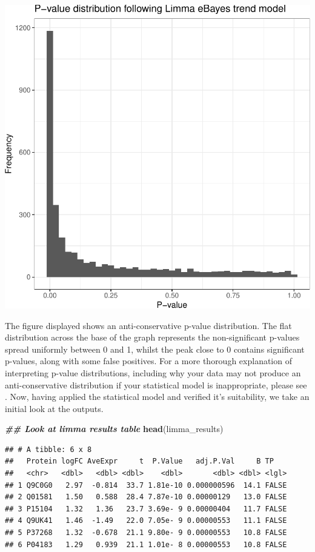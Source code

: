 \documentclass[9pt,a4paper,]{extarticle}
\newenvironment{Shaded}{\begin{snugshade}}{\end{snugshade}}
\newcommand{\DocumentationTok}[1]{\textcolor[rgb]{0.56,0.35,0.01}{\textbf{\textit{#1}}}}
\newcommand{\FunctionTok}[1]{\textcolor[rgb]{0.13,0.29,0.53}{\textbf{#1}}}
\newcommand{\NormalTok}[1]{#1}
\begin{document}
\begin{center}\includegraphics[height=0.3\textheight]{workflow_expressions_files/figure-latex/pvalue_histogram-1} \end{center}

The figure displayed shows an anti-conservative p-value distribution. The flat
distribution across the base of the graph represents the non-significant p-values
spread uniformly between 0 and 1, whilst the peak close to 0 contains significant
p-values, along with some false positives. For a more thorough explanation of
interpreting p-value distributions, including why your data may not produce an
anti-conservative distribution if your statistical model is inappropriate, please
see \citep{p_val}. Now, having applied the statistical model and verified it's
suitability, we take an initial look at the outputs.

\begin{Shaded}
\begin{Highlighting}[]
\DocumentationTok{\#\# Look at limma results table}
\FunctionTok{head}\NormalTok{(limma\_results)}
\end{Highlighting}
\end{Shaded}

\begin{verbatim}
## # A tibble: 6 x 8
##   Protein logFC AveExpr     t  P.Value   adj.P.Val     B TP   
##   <chr>   <dbl>   <dbl> <dbl>    <dbl>       <dbl> <dbl> <lgl>
## 1 Q9C0G0   2.97  -0.814  33.7 1.81e-10 0.000000596  14.1 FALSE
## 2 Q01581   1.50   0.588  28.4 7.87e-10 0.00000129   13.0 FALSE
## 3 P15104   1.32   1.36   23.7 3.69e- 9 0.00000404   11.7 FALSE
## 4 Q9UK41   1.46  -1.49   22.0 7.05e- 9 0.00000553   11.1 FALSE
## 5 P37268   1.32  -0.678  21.1 9.80e- 9 0.00000553   10.8 FALSE
## 6 P04183   1.29   0.939  21.1 1.01e- 8 0.00000553   10.8 FALSE
\end{verbatim}
\end{document}
